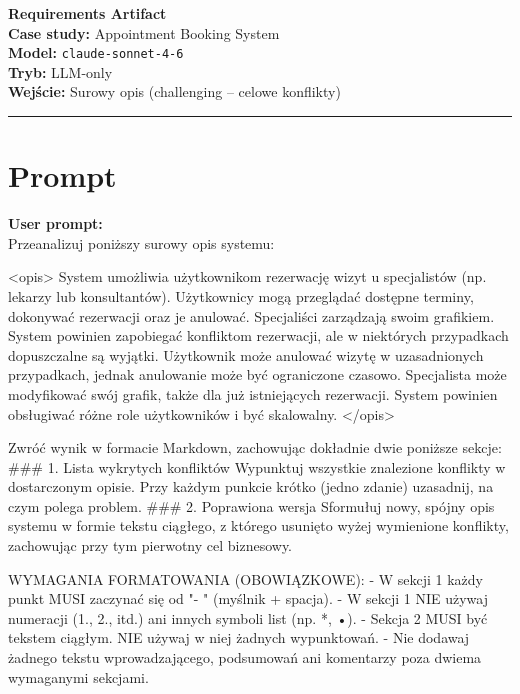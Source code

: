 \documentclass[12pt,a4paper]{article}
\begin{document}
\begin{center}
  {\LARGE\bfseries Requirements Artifact}\\[1.5em]
  {\large \textbf{Case study:} Appointment Booking System}\\[0.3em]
  {\large \textbf{Model:} \texttt{claude-sonnet-4-6}}\\[0.3em]
  {\large \textbf{Tryb:} LLM-only}\\[0.3em]
  {\large \textbf{Wejście:} Surowy opis (challenging -- celowe konflikty)}
\end{center}

\vspace{1em}\hrule\vspace{1.5em}

\section{Prompt}

\begin{mdframed}[backgroundcolor=promptbg, linewidth=0pt, innerleftmargin=10pt, innerrightmargin=10pt, innertopmargin=8pt, innerbottommargin=8pt]
\textbf{User prompt:}\\[0.3em]
\small
Przeanalizuj poniższy surowy opis systemu:

<opis>
System umożliwia użytkownikom rezerwację wizyt u specjalistów (np. lekarzy lub konsultantów). Użytkownicy mogą przeglądać dostępne terminy, dokonywać rezerwacji oraz je anulować. Specjaliści zarządzają swoim grafikiem. System powinien zapobiegać konfliktom rezerwacji, ale w niektórych przypadkach dopuszczalne są wyjątki. Użytkownik może anulować wizytę w uzasadnionych przypadkach, jednak anulowanie może być ograniczone czasowo. Specjalista może modyfikować swój grafik, także dla już istniejących rezerwacji. System powinien obsługiwać różne role użytkowników i być skalowalny.
</opis>

Zwróć wynik w formacie Markdown, zachowując dokładnie dwie poniższe sekcje:
### 1. Lista wykrytych konfliktów
Wypunktuj wszystkie znalezione konflikty w dostarczonym opisie. Przy każdym punkcie krótko (jedno zdanie) uzasadnij, na czym polega problem.
### 2. Poprawiona wersja
Sformułuj nowy, spójny opis systemu w formie tekstu ciągłego, z którego usunięto wyżej wymienione konflikty, zachowując przy tym pierwotny cel biznesowy.

WYMAGANIA FORMATOWANIA (OBOWIĄZKOWE):
- W sekcji 1 każdy punkt MUSI zaczynać się od "- " (myślnik + spacja).
- W sekcji 1 NIE używaj numeracji (1., 2., itd.) ani innych symboli list (np. *, •).
- Sekcja 2 MUSI być tekstem ciągłym. NIE używaj w niej żadnych wypunktowań.
- Nie dodawaj żadnego tekstu wprowadzającego, podsumowań ani komentarzy poza dwiema wymaganymi sekcjami.
\end{mdframed}
\end{document}
